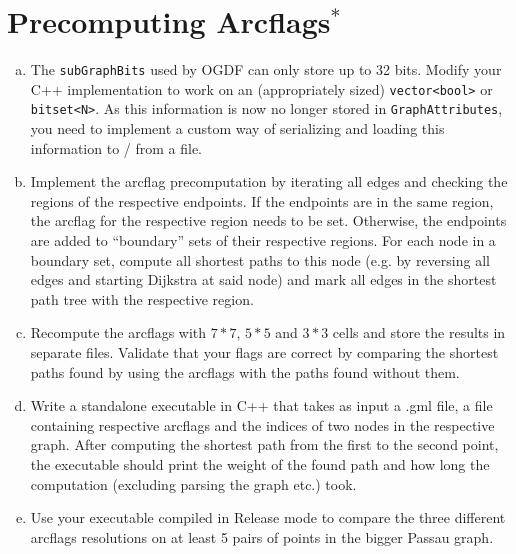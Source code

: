 \documentclass{article}
\begin{document}
\section{Precomputing Arcflags$^\ast$}
\begin{enumerate}[a)]
\item The \texttt{subGraphBits} used by OGDF can only store up to 32 bits. Modify your C++ implementation to work on an (appropriately sized) \texttt{vector<bool>} or \texttt{bitset<N>}. As this information is now no longer stored in \texttt{GraphAttributes}, you need to implement a custom way of serializing and loading this information to / from a file.
\item Implement the arcflag precomputation by iterating all edges and checking the regions of the respective endpoints. If the endpoints are in the same region, the arcflag for the respective region needs to be set. Otherwise, the endpoints are added to ``boundary'' sets of their respective regions. For each node in a boundary set, compute all shortest paths to this node (e.g. by reversing all edges and starting Dijkstra at said node) and mark all edges in the shortest path tree with the respective region.
\item Recompute the arcflags with $7*7$, $5*5$ and $3*3$ cells and store the results in separate files. Validate that your flags are correct by comparing the shortest paths found by using the arcflags with the paths found without them.
\item Write a standalone executable in C++ that takes as input a .gml file, a file containing respective arcflags and the indices of two nodes in the respective graph. After computing the shortest path from the first to the second point, the executable should print the weight of the found path and how long the computation (excluding parsing the graph etc.) took.
\item Use your executable compiled in Release mode to compare the three different arcflags resolutions on at least 5 pairs of points in the bigger Passau graph.
\end{enumerate}
\end{document}
